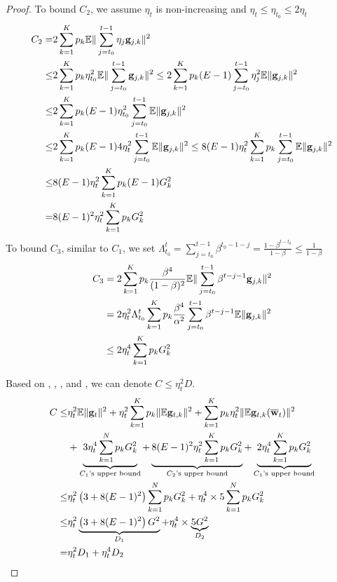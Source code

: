 \begin{proof}
To bound $C_2$, we assume $\eta_t$ is non-increasing and $\eta_t  \leq \eta_{t_0}  \leq 2 \eta_t$
\begin{align}
 C_2 = & 2\sum_{k=1}^K p_k \mathbb{E} \|\sum_{j=t_0}^{t-1}\eta_j {\mathbf{g}}_{j,k}\|^2\\
 \leq& 2\sum_{k=1}^K p_k \eta_{t_0}^2 \mathbb{E} \|\sum_{j=t_0}^{t-1} {\mathbf{g}}_{j,k}\|^2
 \leq 2\sum_{k=1}^K p_k  (E-1)\sum_{j=t_0}^{t-1}\eta_{j}^2 \mathbb{E} \| {\mathbf{g}}_{j,k}\|^2\\
 \leq & 2\sum_{k=1}^K p_k  (E-1)\eta_{t_0}^2 \sum_{j=t_0}^{t-1} \mathbb{E} \| {\mathbf{g}}_{j,k}\|^2\\
 \leq & 2\sum_{k=1}^K p_k  (E-1)4\eta_{t}^2 \sum_{j=t_0}^{t-1} \mathbb{E} \| {\mathbf{g}}_{j,k}\|^2 \leq 8(E-1)\eta_{t}^2 \sum_{k=1}^K p_k \sum_{j=t_0}^{t-1} \mathbb{E} \| {\mathbf{g}}_{j,k}\|^2 \\
 \leq & 8(E-1)\eta_{t}^2 \sum_{k=1}^K p_k (E-1)G_k^2 \\
 =  & 8(E-1)^2\eta_{t}^2 \sum_{k=1}^K p_k G_k^2   \label{eq:nagcvxc2}
\end{align}
To bound $C_3$, similar to $C_1$, we set $\Lambda_{t_0}^{t} = \sum_{j=t_0}^{t - 1}\beta^{t_0-1-j} =  \frac{1 - \beta^{t-t_0}}{1- \beta} \leq \frac{1}{1 - \beta} $
\begin{align}
	C_3 & = 2\sum_{k=1}^K p_k \frac{\beta^4}{(1 - \beta)^2} \mathbb{E}\|\sum_{j=t_0}^{t-1}\beta^{t-j-1}{\mathbf{g}}_{j,k}\|^2\\
        & = 2\eta_t^2 \Lambda_{t_0}^{t}\sum_{k=1}^K p_k \frac{\beta^4}{\alpha^2} \sum_{j=t_0}^{t-1}\beta^{t-j-1} \mathbb{E}\|{\mathbf{g}}_{j,k}\|^2 \\
        & \leq 2 \eta_t^4 \sum_{k=1}^K p_k G_k^2  \label{eq:nagcvxc3}
\end{align}

Based on \eq{\ref{eq:nagcvxc}}, \eq{\ref{eq:nagcvxc1}}, \eq{\ref{eq:nagcvxc2}}, and \eq{\ref{eq:nagcvxc3}}, we can denote $C \leq \eta_t^2 D$.
\begin{align}
	C \leq& \eta_t^2\mathbb{E}\|{\mathbf{g}}_t\|^2 +\eta^2_t \sum_{k=1}^K p_k\|\mathbb{E} {\mathbf{g}}_{t,k}\|^2+ \sum_{k=1}^K p_k \eta_t^2 \|\mathbb{E} {\mathbf{g}}_{t,k}(\overline{{\mathbf{w}}}_t)\|^2  \nonumber \\
	& + \underbrace{3 \eta_t^4\sum_{k=1}^N p_k G_k^2}_{C_1\text{'s upper bound}} + \underbrace{8(E-1)^2\eta_{t}^2 \sum_{k=1}^K p_k G_k^2}_{C_2\text{'s upper bound}} + \underbrace{2 \eta_t^4 \sum_{k=1}^K p_k G_k^2 }_{C_1\text{'s upper bound}} \\
	  \leq & \eta_t^2 \left(3 + 8(E-1)^2\right)\sum_{k=1}^N p_k G_k^2   + \eta_t^4 \times 5 \sum_{k=1}^N p_k G_k^2 \\
	  \leq & \eta_t^2 \underbrace{\left(3 + 8(E-1)^2\right)G^2}_{D_1}   + \eta_t^4 \times \underbrace{5 G^2}_{D_2} \\
	  = &  \eta_t^2 D_1 + \eta_t^4 D_2 
\end{align}


\end{proof}

